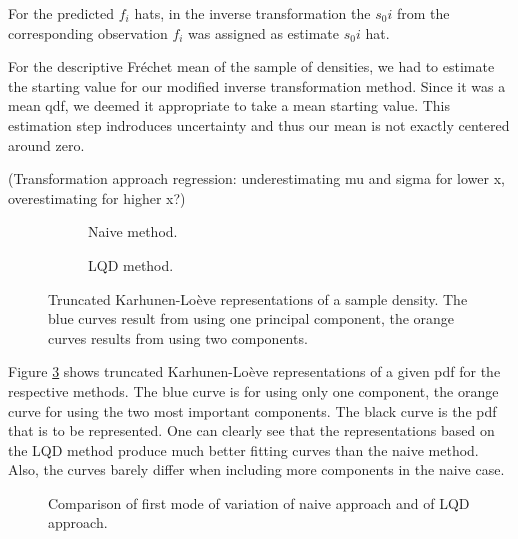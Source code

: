 For the predicted $f_i$ hats,
in the inverse transformation the $s_0i$ from the corresponding observation $f_i$ was
assigned as estimate $s_0i$ hat.

For the descriptive Fréchet mean of the sample of densities, we had to estimate the
starting value for our modified inverse transformation method. Since it was a mean qdf,
we deemed it appropriate to take a mean starting value. This estimation step indroduces
uncertainty and thus our mean is not exactly centered around zero.

(Transformation approach regression: underestimating mu and sigma for lower x,
overestimating for higher x?) \textcite{PetersenLiuDivani2021}

\newpage
\begin{figure}[h]
    \centering
    \begin{subfigure}[b]{\textwidth}
        \centering
        \resizebox{0.45\linewidth}{!}{}
        \caption[Truncated representation --- naive]{Naive method.}
        \label{fig:naive_trunc_rep}
    \end{subfigure}
    \hfill %
    \begin{subfigure}[b]{\textwidth}
        \centering
        \resizebox{0.45\linewidth}{!}{}
        \caption[Truncated representation --- LQD method]{LQD method.}
        \label{fig:trunc_rep}
    \end{subfigure}
    \caption[Truncated Karhunen-Loève representations]{Truncated Karhunen-Loève
    representations of a sample density. The blue curves result from using one principal
    component, the orange curves results from using two components.}
    \label{fig:trunc_reps}
\end{figure}

Figure \ref{fig:trunc_reps} shows truncated Karhunen-Loève representations of a given
pdf for the respective methods. The blue curve is for using only one component, the
orange curve for using the two most important components. The black curve is the pdf
that is to be represented. One can clearly see that the representations based on the LQD
method produce much better fitting curves than the naive method. Also, the curves barely
differ when including more components in the naive case.

\begin{figure}[h]
    \centering
    \resizebox{0.9\textwidth}{!}{}
    \caption[Comparison: first mode of variation]{Comparison of first mode of variation
    of naive approach and of LQD approach.}
    \label{fig:1st_modes}
\end{figure}

